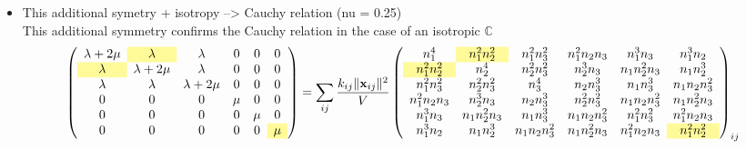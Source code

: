 \documentclass[10pt, onecolumn]{article}
\begin{document}
\begin{itemize}
\begin{equation}
{\begin{array}{cccccc}
n_1^2 n_3^2 & n_2^2 n_3^2 & n_3^4 & n_2 n_3^3 & n_1 n_3^3 & n_1 n_2 n_3^2 \\
n_1^2 n_2 n_3 & n_2^3 n_3 & n_2 n_3^3 & n_2^2 n_3^2 & n_1 n_2 n_3^2 & n_1 n_2^2 n_3 \\
n_1^3 n_3 & n_1 n_2^2 n_3 & n_1 n_3^3 & n_1 n_2 n_3^2 & n_1^2 n_3^2 & n_1^2 n_2 n_3 \\
n_1^3 n_2 & n_1 n_2^3 & n_1 n_2 n_3^2 & n_1 n_2^2 n_3 & n_1^2 n_2 n_3 & \cellcolor{yellow!40} n_1^2 n_2^2
\end{array}
\right)
}_{ \mathbb{N}_{ij} \equiv \displaystyle [\underline{n}_{ij}^{\otimes 4}]_{\text{Voigt}},\quad \text{notation}: n_\alpha \equiv n_{ij,\alpha}}
\label{detailed energy match}
\end{equation}

The fourth order tensor $\underline{n}_{ij}^{\otimes 4}$  has the same major and minor symmetries as $\mathbb{C}$ and an additional symmetry due to the commutativity of product. $\mathbb{N}_{ij, \alpha \alpha \beta \beta} = \mathbb{N}_{ij, \alpha \beta \alpha \beta} $
(an example of this additional symmetry is colored in the matrix above).

\item This additional symetry + isotropy --> Cauchy relation (nu = 0.25)
\\This additional symmetry confirms the Cauchy relation in the case of an isotropic $\mathbb{C}$ 
\begin{equation}
\left(
\begin{array}{cccccc}
\lambda + 2\mu & \cellcolor{yellow!40} \lambda & \lambda & 0 & 0 & 0 \\
\cellcolor{yellow!40} \lambda & \lambda + 2\mu & \lambda & 0 & 0 & 0 \\
\lambda & \lambda & \lambda + 2\mu & 0 & 0 & 0 \\
0 & 0 & 0 & \mu & 0 & 0 \\
0 & 0 & 0 & 0 & \mu & 0 \\
0 & 0 & 0 & 0 & 0 & \cellcolor{yellow!40} \mu
\end{array}
\right)
= \sum_{ij} \frac{k_{ij} \|\mathbf{x}_{ij}\|^2}{V}
\left(
\begin{array}{cccccc}
n_1^4 & \cellcolor{yellow!40} n_1^2 n_2^2 & n_1^2 n_3^2 & n_1^2 n_2 n_3 & n_1^3 n_3 & n_1^3 n_2 \\
\cellcolor{yellow!40} n_1^2 n_2^2 & n_2^4 & n_2^2 n_3^2 & n_2^3 n_3 & n_1 n_2^2 n_3 & n_1 n_2^3 \\
n_1^2 n_3^2 & n_2^2 n_3^2 & n_3^4 & n_2 n_3^3 & n_1 n_3^3 & n_1 n_2 n_3^2 \\
n_1^2 n_2 n_3 & n_2^3 n_3 & n_2 n_3^3 & n_2^2 n_3^2 & n_1 n_2 n_3^2 & n_1 n_2^2 n_3 \\
n_1^3 n_3 & n_1 n_2^2 n_3 & n_1 n_3^3 & n_1 n_2 n_3^2 & n_1^2 n_3^2 & n_1^2 n_2 n_3 \\
n_1^3 n_2 & n_1 n_2^3 & n_1 n_2 n_3^2 & n_1 n_2^2 n_3 & n_1^2 n_2 n_3 & \cellcolor{yellow!40} n_1^2 n_2^2
\end{array}
\right)_{ij}
\end{equation}


\end{itemize}
\end{document}
